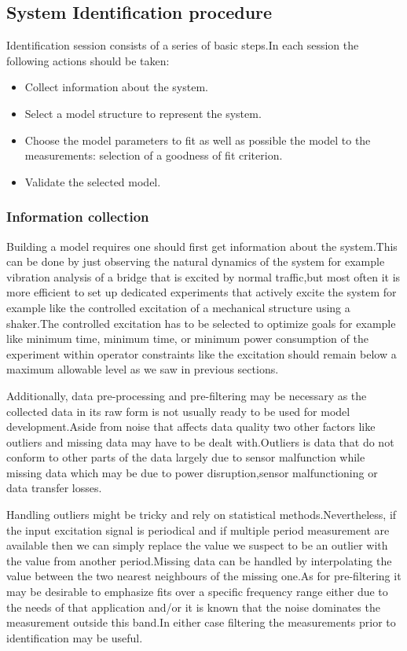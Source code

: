 \documentclass[a4paper,12pt]{article}
\numberwithin{equation}{section}
\begin{document}
\subsection{System Identification procedure}
Identification session consists of a series of basic steps.In each session the following actions should be taken:
\begin{itemize}
    \item Collect information about the system.
    \item Select a model structure to represent the system.
    \item Choose the model parameters to fit as well as possible the model to the measurements:
selection of a goodness of fit criterion.
     \item Validate the selected model.
\end{itemize}

\subsubsection{Information collection}
Building a model requires one should first get information about the system.This can be done by just observing the natural dynamics of the system for example vibration analysis of a bridge that is excited by normal traffic,but most often it is more efficient to set up dedicated experiments that actively excite the system for example like the controlled excitation of a mechanical structure using a shaker.The controlled excitation has to be selected to optimize  goals  for example like minimum time, minimum time, or minimum power consumption of the experiment within operator constraints like the excitation should remain below a maximum allowable level as we saw in previous sections.

Additionally, data pre-processing and pre-filtering  may be necessary as the collected data in its raw form is not usually ready to be used for model development.Aside from noise that affects data quality two other factors like outliers and missing data may have to be dealt with.Outliers is data that do not conform to other parts of the data largely due to sensor malfunction while  missing data which may be due to power disruption,sensor malfunctioning or data transfer losses. 

Handling outliers might be tricky and rely on statistical methods.Nevertheless, if the input excitation signal is periodical and if multiple period measurement are available then we can simply replace the value we suspect to be an outlier with the value from another period.Missing data can be handled by interpolating the value between the two nearest neighbours of the missing one.As for pre-filtering it may be desirable to emphasize fits over a specific frequency range either due to the needs of that application and/or it is known that the noise dominates the measurement outside this band.In either case  filtering the measurements prior to identification may be useful.
\end{document}
